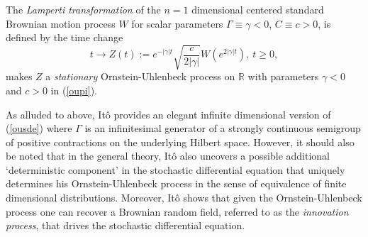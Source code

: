\documentclass[11pt]{article}
\numberwithin{equation}{section}
\theoremstyle{definition}
\theoremstyle{remark}
\theoremstyle{definition}
\begin{document}
The {\it Lamperti transformation} of the $n=1$ dimensional
 centered standard Brownian motion process $W$ 
 for scalar parameters  $\Gamma\equiv\gamma < 0$,
$C\equiv c>0$, is defined by the time change 
\begin{equation}
t\to {Z}(t) := e^{{-|\gamma|} t}\sqrt{\frac{c}{2|\gamma|}}
{W}(e^{2|\gamma| t}), \ t\ge 0,
\end{equation}
makes  ${Z}$ a {\it stationary} Ornstein-Uhlenbeck process
on $\mathbb{R}$  with parameters
$\gamma<0$ and $c>0$ in
(\ref{oupi}). 

 As alluded to above, It\^o provides an elegant infinite dimensional version of (\ref{ousde}) where $\Gamma$
is an infinitesimal generator of a strongly continuous semigroup of positive contractions on the underlying Hilbert
space. However, it should also be noted that 
in the general theory, It\^o also uncovers
a possible additional `deterministic component' in
the stochastic differential equation that uniquely
determines his
Ornstein-Uhlenbeck process in the sense of equivalence of
finite dimensional distributions.  Moreover, It\^o shows
that given the Ornstein-Uhlenbeck process one can
recover a Brownian random field, referred to as 
the {\it innovation process},  that drives the 
stochastic differential equation. 
\end{document}
